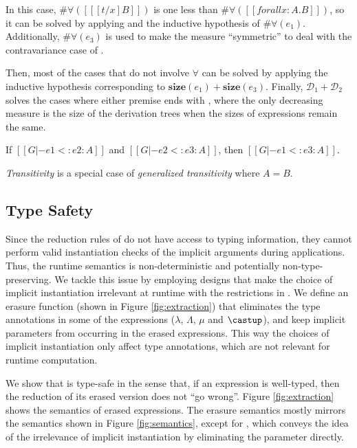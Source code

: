 \noindent In this case, $\#\forall({[[ [t / x] B]]})$ is one
less than $\#\forall([[forall x : A. B]])$,
so it can be solved by applying  and the
inductive hypothesis of $\#\forall(e_1)$.
Additionally, $\#\forall(e_3)$ is used to make the measure ``symmetric''
to deal with the contravariance case of .

Then, most of the cases that do not involve $\forall$ can be
solved by applying the inductive hypothesis corresponding to
$\mathbf{size}(e_1) + \mathbf{size}(e_3)$.
Finally, $\mathcal{D}_1 + \mathcal{D}_2$ solves
the cases where either premise ends with , where the only decreasing
measure is the size of the derivation trees when the sizes of expressions remain
the same.

\begin{corollary}[Transitivity]
    If $[[G |- e1 <: e2 : A]]$ and $[[G |- e2 <: e3 : A]]$,
    then $[[G |- e1 <: e3 : A]]$.
\end{corollary}

\emph{Transitivity} is a special case of \emph{generalized transitivity} where $A = B$.

\subsection{Type Safety}
\label{sec:type-safety}

Since the reduction rules of \name do not have access to typing information, they
cannot perform valid instantiation checks of the implicit arguments during applications.
Thus, the runtime semantics is non-deterministic and potentially non-type-preserving.
We tackle this issue by employing designs that make the choice of implicit instantiation
irrelevant at runtime with the restrictions in .
We define an erasure function (shown in Figure \ref{fig:extraction})
that eliminates the type annotations
in some of the expressions ($\lambda$, $\Lambda$, $\mu$ and $\castup$),
and keep implicit parameters from occurring in the erased expressions.
This way the choices of implicit instantiation only affect type annotations,
which are not relevant for runtime computation.

We show that \name is type-safe in the sense that,
if an expression is well-typed, then the reduction of its erased version
does not ``go wrong''. Figure \ref{fig:extraction} shows the semantics of
erased expressions. The erasure semantics mostly mirrors the semantics
shown in Figure \ref{fig:semantics}, except for , which
conveys the idea of the irrelevance of implicit instantiation by eliminating the
parameter directly.

